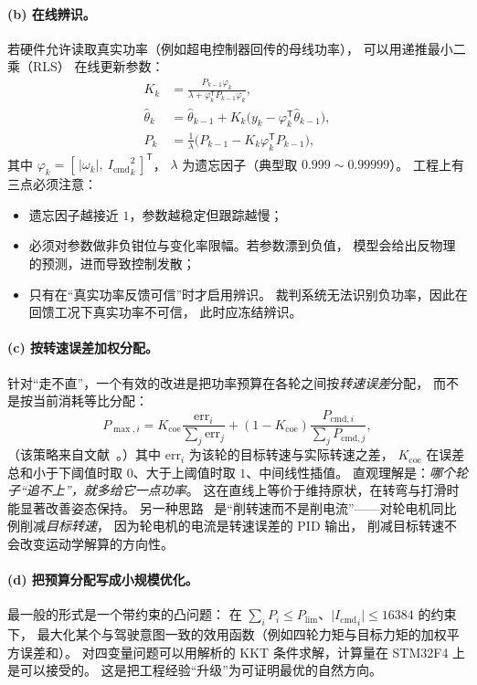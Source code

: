 \documentclass[cn,blue,11pt,device=normal]{elegantnote}
\newcommand{\Icmd}{I_{\mathrm{cmd}}{}}
\newcommand{\Plim}{P_{\mathrm{lim}}{}}
\begin{document}
\paragraph{(b) 在线辨识。}
若硬件允许读取真实功率（例如超电控制器回传的母线功率），
可以用递推最小二乘（RLS）\cite{ljung1999system,hkustpowermodule} 在线更新参数：
\begin{align}
  K_k &= \frac{P_{k-1}\varphi_k}{\lambda + \varphi_k^{\mathsf T}P_{k-1}\varphi_k},\\
  \hat\theta_k &= \hat\theta_{k-1} + K_k\bigl(y_k - \varphi_k^{\mathsf T}\hat\theta_{k-1}\bigr),\\
  P_k &= \frac{1}{\lambda}\bigl(P_{k-1} - K_k\varphi_k^{\mathsf T}P_{k-1}\bigr),
\end{align}
其中 $\varphi_k = [\,\lvert\omega_k\rvert,\ {\Icmd}_k^{2}\,]^{\mathsf T}$，
$\lambda$ 为遗忘因子（典型取 $0.999\sim0.99999$）。
工程上有三点必须注意：
\begin{itemize}
  \item 遗忘因子越接近 $1$，参数越稳定但跟踪越慢；
  \item 必须对参数做非负钳位与变化率限幅。若参数漂到负值，
  模型会给出反物理的预测，进而导致控制发散；
  \item 只有在“真实功率反馈可信”时才启用辨识。
  裁判系统无法识别负功率，因此在回馈工况下真实功率不可信，
  此时应冻结辨识。
\end{itemize}

\paragraph{(c) 按转速误差加权分配。}
针对“走不直”，一个有效的改进是把功率预算在各轮之间按\emph{转速误差}分配，
而不是按当前消耗等比分配：
\begin{equation}\label{eq:errdist}
  P_{\max,i} = K_{\mathrm{coe}}\frac{\mathrm{err}_i}{\sum_j \mathrm{err}_j}
             + (1-K_{\mathrm{coe}})\frac{P_{\mathrm{cmd},i}}{\sum_j P_{\mathrm{cmd},j}} ,
\end{equation}
（该策略来自文献~\cite{hkustpowermodule}。）其中 $\mathrm{err}_i$ 为该轮的目标转速与实际转速之差，
$K_{\mathrm{coe}}$ 在误差总和小于下阈值时取 $0$、大于上阈值时取 $1$、中间线性插值。
直观理解是：\emph{哪个轮子“追不上”，就多给它一点功率}。
这在直线上等价于维持原状，在转弯与打滑时能显著改善姿态保持。
另一种思路~\cite{zjuwiki} 是“削转速而不是削电流”——对轮电机同比例削减\emph{目标转速}，
因为轮电机的电流是转速误差的 PID 输出，
削减目标转速不会改变运动学解算的方向性。

\paragraph{(d) 把预算分配写成小规模优化。}
最一般的形式是一个带约束的凸问题：
在 $\sum_i P_i \le \Plim$、$\lvert{\Icmd}_i\rvert\le16384$ 的约束下，
最大化某个与驾驶意图一致的效用函数（例如四轮力矩与目标力矩的加权平方误差和）。
对四变量问题可以用解析的 KKT 条件求解，计算量在 STM32F4 上是可以接受的。
这是把工程经验“升级”为可证明最优的自然方向。
\end{document}
